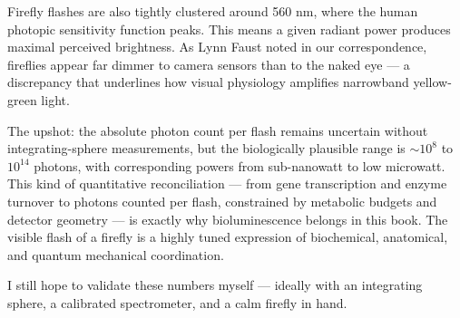 \begin{commentary}
Firefly flashes are also tightly clustered around 560 nm, where the human photopic sensitivity function peaks. This means a given radiant power produces maximal perceived brightness. As Lynn Faust noted in our correspondence, fireflies appear far dimmer to camera sensors than to the naked eye — a discrepancy that underlines how visual physiology amplifies narrowband yellow-green light.

The upshot: the absolute photon count per flash remains uncertain without integrating-sphere measurements, but the biologically plausible range is $\sim 10^8$ to $10^{14}$ photons, with corresponding powers from sub-nanowatt to low microwatt. This kind of quantitative reconciliation — from gene transcription and enzyme turnover to photons counted per flash, constrained by metabolic budgets and detector geometry — is exactly why bioluminescence belongs in this book. The visible flash of a firefly is a highly tuned expression of biochemical, anatomical, and quantum mechanical coordination.

I still hope to validate these numbers myself — ideally with an integrating sphere, a calibrated spectrometer, and a calm firefly in hand.
\end{commentary}


